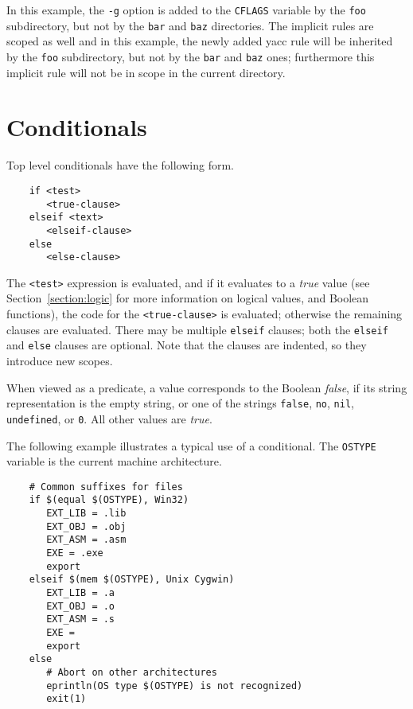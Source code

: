In this example, the \verb+-g+ option is added to the \verb+CFLAGS+
variable by the \verb+foo+ subdirectory, but not by the \verb+bar+ and
\verb+baz+ directories. The implicit rules are scoped as well and in this
example, the newly added yacc rule will be inherited by the \verb+foo+
subdirectory, but not by the \verb+bar+ and \verb+baz+ ones; furthermore
this implicit rule will not be in scope in the current directory.

\section{Conditionals}
\label{section:conditionals}

Top level conditionals have the following form.

\begin{verbatim}
    if <test>
       <true-clause>
    elseif <text>
       <elseif-clause>
    else
       <else-clause>
\end{verbatim}

The \verb+<test>+ expression is evaluated, and if it evaluates to a \emph{true} value (see
Section~\ref{section:logic} for more information on logical values, and Boolean functions), the code
for the \verb+<true-clause>+ is evaluated; otherwise the remaining clauses are evaluated.  There may
be multiple \verb+elseif+ clauses; both the \verb+elseif+ and \verb+else+ clauses are optional.
Note that the clauses are indented, so they introduce new scopes.

When viewed as a predicate, a value corresponds to the Boolean \emph{false}, if its string
representation is the empty string, or one of the strings \verb+false+, \verb+no+, \verb+nil+,
\verb+undefined+, or \verb+0+.  All other values are \emph{true}.

The following example illustrates a typical use of a conditional.  The
\verb+OSTYPE+ variable is the current machine architecture.

\begin{verbatim}
    # Common suffixes for files
    if $(equal $(OSTYPE), Win32)
       EXT_LIB = .lib
       EXT_OBJ = .obj
       EXT_ASM = .asm
       EXE = .exe
       export
    elseif $(mem $(OSTYPE), Unix Cygwin)
       EXT_LIB = .a
       EXT_OBJ = .o
       EXT_ASM = .s
       EXE =
       export
    else
       # Abort on other architectures
       eprintln(OS type $(OSTYPE) is not recognized)
       exit(1)
\end{verbatim}


